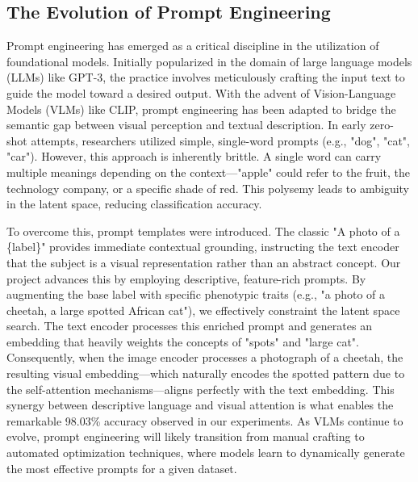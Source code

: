 \documentclass[11pt]{article}
\begin{document}
\subsection{The Evolution of Prompt Engineering}
Prompt engineering has emerged as a critical discipline in the utilization of foundational models. Initially popularized in the domain of large language models (LLMs) like GPT-3, the practice involves meticulously crafting the input text to guide the model toward a desired output. With the advent of Vision-Language Models (VLMs) like CLIP, prompt engineering has been adapted to bridge the semantic gap between visual perception and textual description. In early zero-shot attempts, researchers utilized simple, single-word prompts (e.g., "dog", "cat", "car"). However, this approach is inherently brittle. A single word can carry multiple meanings depending on the context—"apple" could refer to the fruit, the technology company, or a specific shade of red. This polysemy leads to ambiguity in the latent space, reducing classification accuracy.

To overcome this, prompt templates were introduced. The classic "A photo of a \{label\}" provides immediate contextual grounding, instructing the text encoder that the subject is a visual representation rather than an abstract concept. Our project advances this by employing descriptive, feature-rich prompts. By augmenting the base label with specific phenotypic traits (e.g., "a photo of a cheetah, a large spotted African cat"), we effectively constraint the latent space search. The text encoder processes this enriched prompt and generates an embedding that heavily weights the concepts of "spots" and "large cat". Consequently, when the image encoder processes a photograph of a cheetah, the resulting visual embedding—which naturally encodes the spotted pattern due to the self-attention mechanisms—aligns perfectly with the text embedding. This synergy between descriptive language and visual attention is what enables the remarkable 98.03\% accuracy observed in our experiments. As VLMs continue to evolve, prompt engineering will likely transition from manual crafting to automated optimization techniques, where models learn to dynamically generate the most effective prompts for a given dataset.
\end{document}

